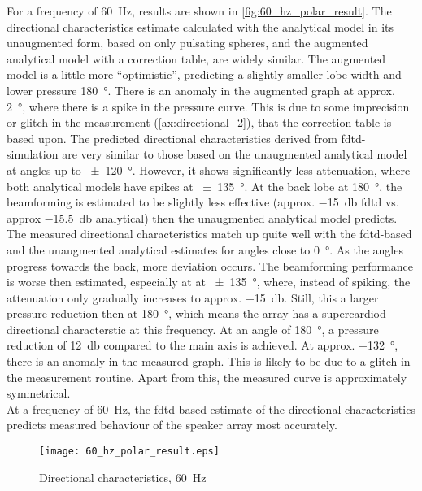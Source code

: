 For a frequency of \SI{60}{\hertz}, results are shown in \autoref{fig:60_hz_polar_result}. The directional characteristics estimate calculated with the analytical model in its unaugmented form, based on only pulsating spheres, and the augmented analytical model with a correction table, are widely similar. The augmented model is a little more ``optimistic'', predicting a slightly smaller lobe width and lower pressure \SI{180}{\degree}. There is an anomaly in the augmented graph at approx. \SI{2}{\degree}, where there is a spike in the pressure curve. This is due to some imprecision or glitch in the measurement (\autoref{ax:directional_2}), that the correction table is based upon. The predicted directional characteristics derived from \gls{fdtd}-simulation are very similar to those based on the unaugmented analytical model at angles up to \SI{\pm 120}{\degree}. However, it shows significantly less attenuation, where both analytical models have spikes at \SI{\pm 135}{\degree}. At the back lobe at \SI{180}{\degree}, the beamforming is estimated to be slightly less effective (approx. \SI{-15}{\decibel} \gls{fdtd} vs. approx \SI{-15.5}{\decibel} analytical) then the unaugmented analytical model predicts. The measured directional characteristics match up quite well with the \gls{fdtd}-based and the unaugmented analytical estimates for angles close to \SI{0}{\degree}. As the angles progress towards the back, more deviation occurs. The beamforming performance is worse then estimated, especially at at \SI{\pm 135}{\degree}, where, instead of spiking, the attenuation only gradually increases to approx. \SI{-15}{\decibel}. Still, this a larger pressure reduction then at \SI{180}{\degree}, which means the array has a supercardiod directional characterstic at this frequency. At an angle of \SI{180}{\degree}, a pressure reduction of \SI{12}{\decibel} compared to the main axis is achieved. At approx. \SI{-132}{\degree}, there is an anomaly in the measured graph. This is likely to be due to a glitch in the measurement routine. Apart from this, the measured curve is approximately symmetrical.\\
At a frequency of \SI{60}{\hertz}, the \gls{fdtd}-based estimate of the directional characteristics predicts measured behaviour of the speaker array most accurately.
\begin{figure}[H]
	\centering
	\texttt{[image: 60\_hz\_polar\_result.eps]}
	\caption{Directional characteristics, \SI{60}{\hertz}}
		\label{fig:60_hz_polar_result}
\end{figure}
